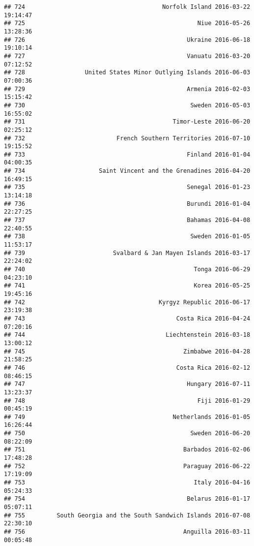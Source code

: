 \documentclass[
]{article}
\begin{document}
\begin{verbatim}
## 724                                       Norfolk Island 2016-03-22 19:14:47
## 725                                                 Niue 2016-05-26 13:28:36
## 726                                              Ukraine 2016-06-18 19:10:14
## 727                                              Vanuatu 2016-03-20 07:12:52
## 728                 United States Minor Outlying Islands 2016-06-03 07:00:36
## 729                                              Armenia 2016-02-03 15:15:42
## 730                                               Sweden 2016-05-03 16:55:02
## 731                                          Timor-Leste 2016-06-20 02:25:12
## 732                          French Southern Territories 2016-07-10 19:15:52
## 733                                              Finland 2016-01-04 04:00:35
## 734                     Saint Vincent and the Grenadines 2016-04-20 16:49:15
## 735                                              Senegal 2016-01-23 13:14:18
## 736                                              Burundi 2016-01-04 22:27:25
## 737                                              Bahamas 2016-04-08 22:40:55
## 738                                               Sweden 2016-01-05 11:53:17
## 739                         Svalbard & Jan Mayen Islands 2016-03-17 22:24:02
## 740                                                Tonga 2016-06-29 04:23:10
## 741                                                Korea 2016-05-25 19:45:16
## 742                                      Kyrgyz Republic 2016-06-17 23:19:38
## 743                                           Costa Rica 2016-04-24 07:20:16
## 744                                        Liechtenstein 2016-03-18 13:00:12
## 745                                             Zimbabwe 2016-04-28 21:58:25
## 746                                           Costa Rica 2016-02-12 08:46:15
## 747                                              Hungary 2016-07-11 13:23:37
## 748                                                 Fiji 2016-01-29 00:45:19
## 749                                          Netherlands 2016-01-05 16:26:44
## 750                                               Sweden 2016-06-20 08:22:09
## 751                                             Barbados 2016-02-06 17:48:28
## 752                                             Paraguay 2016-06-22 17:19:09
## 753                                                Italy 2016-04-16 05:24:33
## 754                                              Belarus 2016-01-17 05:07:11
## 755         South Georgia and the South Sandwich Islands 2016-07-08 22:30:10
## 756                                             Anguilla 2016-03-11 00:05:48

\end{verbatim}
\end{document}
